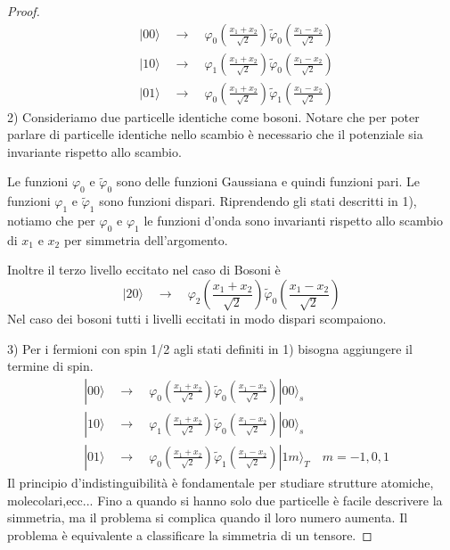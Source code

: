 \begin{proof}
\begin{align*}
	&|00\rangle \quad \to \quad \varphi_0\left(\frac{x_1+x_2}{\sqrt{2}}\right)\tilde{\varphi}_0 \left(\frac{x_1 -x_2}{\sqrt{2}}\right) \\[0.5cm]
	&|10 \rangle \quad \to \quad \varphi_1\left(\frac{x_1+x_2}{\sqrt{2}}\right) \tilde{\varphi}_0\left(\frac{x_1 -x_2}{\sqrt{2}}\right) \\[0.5cm]
	&|01 \rangle \quad \to \quad \varphi_0\left(\frac{x_1+x_2}{\sqrt{2}}\right)\tilde{\varphi}_1\left(\frac{x_1 -x_2}{\sqrt{2}}\right)
\end{align*}
2) Consideriamo due particelle identiche come bosoni. Notare che per poter parlare di particelle identiche nello scambio \`e necessario che il potenziale sia invariante rispetto allo scambio.

Le funzioni $\varphi_0$ e $\tilde{\varphi}_0$ sono delle funzioni Gaussiana e quindi funzioni pari.
Le funzioni $\varphi_1$ e $\tilde{\varphi}_1$ sono funzioni dispari. Riprendendo gli stati descritti in 1), notiamo che per $\varphi_0$ e $\varphi_1$ le funzioni d'onda sono invarianti rispetto allo scambio di $x_1$ e $x_2$ per simmetria dell'argomento. 

Inoltre il terzo livello eccitato nel caso di Bosoni \`e 
\begin{equation*}
	|20 \rangle \quad \to \quad \varphi_2\left(\frac{x_1+x_2}{\sqrt{2}}\right)\tilde{\varphi}_0\left(\frac{x_1 -x_2}{\sqrt{2}}\right)
\end{equation*}
Nel caso dei bosoni tutti i livelli eccitati in modo dispari scompaiono.

3) Per i fermioni con spin 1/2 agli stati definiti in 1) bisogna aggiungere il termine di spin.
\newpage
\begin{align*}
	&|00\rangle \quad \to \quad \varphi_0\left(\frac{x_1+x_2}{\sqrt{2}}\right)\tilde{\varphi}_0 \left(\frac{x_1 -x_2}{\sqrt{2}}\right)|00\rangle_s \\[0.5cm]
	&|10 \rangle \quad \to \quad \varphi_1\left(\frac{x_1+x_2}{\sqrt{2}}\right) \tilde{\varphi}_0\left(\frac{x_1 -x_2}{\sqrt{2}}\right)|00\rangle_s \\[0.5cm]
	&|01 \rangle \quad \to \quad \varphi_0\left(\frac{x_1+x_2}{\sqrt{2}}\right)\tilde{\varphi}_1\left(\frac{x_1 -x_2}{\sqrt{2}}\right)|1m\rangle_T \quad m=-1,0,1
\end{align*}
Il principio d'indistinguibilit\`a \`e fondamentale per studiare strutture atomiche, molecolari,ecc... Fino a quando si hanno solo due particelle \`e facile descrivere la simmetria, ma il problema si complica quando il loro numero aumenta. Il problema \`e equivalente a classificare la simmetria di un tensore.

\end{proof}
